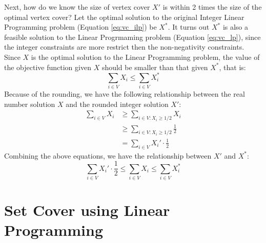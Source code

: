 \documentclass{article}
\begin{document}
Next, how do we know the size of vertex cover $X'$ is within 2 times the size
of the optimal vertex cover?
Let the optimal solution to the original Integer Linear Programming
problem (Equation \ref{eq:vc_ilp}) be $X^{*}$.
It turns out $X^{*}$ is also a feasible solution to the Linear Progrmaming
problem (Equation \ref{eq:vc_lp}), since the integer constraints are
more restrict then the non-negativity constraints. Since $X$ is the optimal
solution to the Linear Programming problem, the value of the objective function
given $X$ should be smaller than that given $X^{*}$, that is:
\begin{equation}
\sum_{i \in V} X_{i} \le \sum_{i \in V} X_{i}^{*}
\end{equation}
Because of the rounding, we have the following relationship between the 
real number solution $X$ and the rounded integer solution $X'$:
\begin{equation}
	\begin{split}
		\sum_{i \in V} X_{i} 
		&\ge \sum_{i \in V:X_i \ge 1/2} X_i\\
		&\ge \sum_{i \in V:X_i \ge 1/2} \frac{1}{2}\\
		&= \sum_{i \in V} X_i'\cdot \frac{1}{2}
	\end{split}
\end{equation}
Combining the above equations, we have the relationship between $X'$ and $X^{*}$:
\begin{equation}
\sum_{i \in V} X_i'\cdot \frac{1}{2} 
\le \sum_{i \in V} X_{i} \le \sum_{i \in V} X_{i}^{*}
\end{equation}


\section{Set Cover using Linear Programming}
\end{document}

